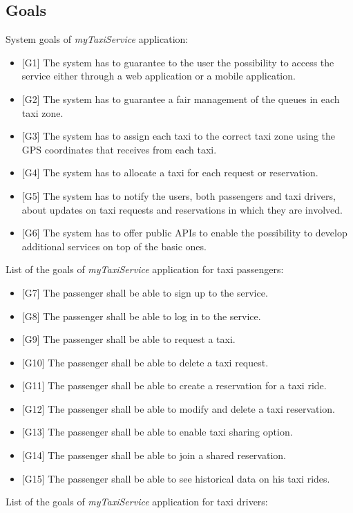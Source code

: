\documentclass[a4paper,11pt]{report} %
\newcommand{\mts}{\mbox{\normalfont\itshape myTaxiService}}
\begin{document}
	\subsection{Goals} \label{sec:goals}
	System goals of \mts{} application:
	\begin{itemize}
		\item {[}G1{]} The system has to guarantee to the user the possibility to access the service either through a web application or a mobile application.
		\item {[}G2{]} The system has to guarantee a fair management of the queues in each taxi zone.
		\item {[}G3{]} The system has to assign each taxi to the correct taxi zone using the GPS coordinates that receives from each taxi.
		\item {[}G4{]} The system has to allocate a taxi for each request or reservation.
		\item {[}G5{]} The system has to notify the users, both passengers and taxi drivers, about updates on taxi requests and reservations in which they are involved.
		\item {[}G6{]} The system has to offer public APIs to enable the possibility to develop additional services on top of the basic ones.
	\end{itemize}
	List of the goals of \mts{} application for taxi passengers:
		\begin{itemize}
			\item {[}G7{]} The passenger shall be able to sign up to the service.
			\item {[}G8{]} The passenger shall be able to log in to the service.
			\item {[}G9{]} The passenger shall be able to request a taxi.
			\item {[}G10{]} The passenger shall be able to delete a taxi request.
			\item {[}G11{]} The passenger shall be able to create a reservation for a taxi ride.
			\item {[}G12{]} The passenger shall be able to modify and delete a taxi reservation.
			\item {[}G13{]} The passenger shall be able to enable taxi sharing option.
			\item {[}G14{]} The passenger shall be able to join a shared reservation.
			\item {[}G15{]} The passenger shall be able to see historical data on his taxi rides.
		\end{itemize}
		List of the goals of \mts{} application for taxi drivers:
\end{document}
